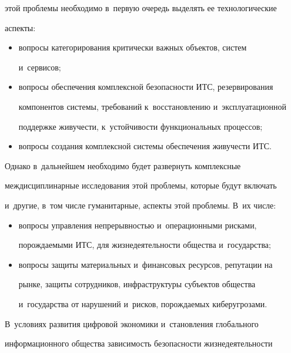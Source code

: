 этой проблемы необходимо в~первую очередь выделять ее технологические 


аспекты:


  \begin{itemize}


  \item вопросы категорирования критически важных объектов, сис\-тем 


и~сервисов;


  \item вопросы обеспечения комплексной безопасности ИТС, резервирования 


компонентов сис\-те\-мы, требований к~восстановлению и~эксплуатационной 


поддержке живучести, к~устойчивости функциональных процессов;


  \item вопросы создания комплексной сис\-те\-мы обеспечения живучести ИТС.


  \end{itemize}


  


  Однако в~дальнейшем необходимо будет развернуть комплексные 


междисциплинарные исследования этой проблемы, которые будут включать 


и~другие, в~том числе гуманитарные, аспекты этой проблемы. В~их числе:


  \begin{itemize}


  \item вопросы управления непрерывностью и~операционными рисками, 


по\-рож\-да\-емы\-ми ИТС, для жизнедеятельности общества и~государства;


  \item вопросы защиты материальных и~финансовых ресурсов, репутации на 


рынке, защиты сотрудников, инфраструктуры субъектов общества 


и~государства от нарушений и~рисков, порождаемых киберугрозами.


  \end{itemize}


  


  В~условиях развития цифровой экономики и~становления глобального 


информационного общества зависимость безопасности жизнедеятельности 


